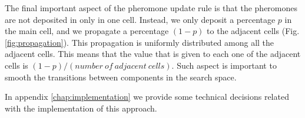 			The final important aspect of the pheromone update rule is that the pheromones are not deposited in only in one cell. Instead, we only deposit a percentage $p$ in the main cell, and we propagate a percentage $(1-p)$ to the adjacent cells (Fig. \ref{fig:propagation}). This propagation is uniformly distributed among all the adjacent cells. This means that the value that is given to each one of the adjacent cells is $(1-p) / (number\ of\ adjacent\ cells)$. Such aspect is important to smooth the transitions between components in the search space.
			
		
		In appendix \ref{chap:implementation} we provide some technical decisions related with the implementation of this approach.
			
			
			
			
			